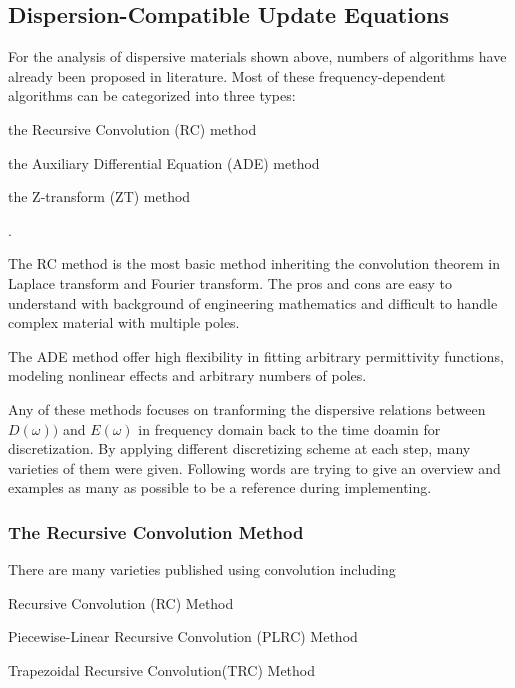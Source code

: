 \subsection{Dispersion-Compatible Update Equations}
For the analysis of dispersive materials shown above, numbers of algorithms have already been proposed in literature.
Most of these frequency-dependent algorithms can be categorized into three types: 
\begin{inparaenum}[(1)]
\item the Recursive Convolution (RC) method
\item the Auxiliary Differential Equation (ADE) method
\item the Z-transform (ZT) method
\end{inparaenum}.

The RC method is the most basic method inheriting the convolution theorem in Laplace transform and Fourier
transform. The pros and cons are easy to understand with background of engineering mathematics and difficult to handle
complex material with multiple poles.

The ADE method offer high flexibility in fitting arbitrary permittivity functions, modeling nonlinear effects and
arbitrary numbers of poles.

Any of these methods focuses on tranforming the dispersive relations between $D(\omega))$ and $E(\omega)$ in frequency domain
back to the time doamin for discretization. By applying different discretizing scheme at each step, many varieties of
them were given. Following words are trying to give an overview and examples as many as possible to be a reference
during implementing.

\subsubsection{The Recursive Convolution Method}
There are many varieties published using convolution including 
\begin{inparaenum}[(1)]
\item Recursive Convolution (RC) Method
\item Piecewise-Linear Recursive Convolution (PLRC) Method
\item Trapezoidal Recursive Convolution(TRC) Method
\end{inparaenum}


